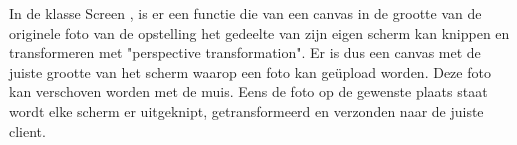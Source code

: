 In de klasse Screen , is er een functie die van een canvas in de grootte van de originele foto van de opstelling het gedeelte van zijn eigen scherm kan knippen en transformeren met "perspective transformation".
Er is dus een canvas met de juiste grootte van het scherm waarop een foto kan geüpload worden. Deze foto kan verschoven worden met de muis. Eens de foto op de gewenste plaats staat wordt elke scherm er uitgeknipt, getransformeerd en verzonden naar de juiste client.